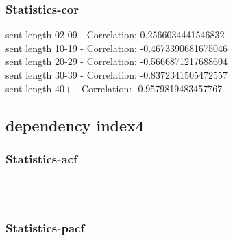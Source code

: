 \documentclass{article}%
\begin{document}
%
\newpage%
\subsubsection{Statistics{-}cor}%
\label{ssubsec:Statistics{-}cor}%
\noindent%
sent length 02-09 - Correlation: 0.2566034441546832\\%
sent length 10-19 - Correlation: -0.4673390681675046\\%
sent length 20-29 - Correlation: -0.5666871217688604\\%
sent length 30-39 - Correlation: -0.8372341505472557\\%
sent length 40+ - Correlation: -0.9579819483457767\\

%
\newpage

%
\subsection{dependency index4}%
\label{subsec:dependencyindex4}%
\subsubsection{Statistics{-}acf}%
\label{ssubsec:Statistics{-}acf}%


\begin{figure}[ht]%
\centering%
\setlength{\abovecaptionskip}{-35pt}%
%
%
\\%
%
%
\\%
%
\end{figure}

%
\newpage%
\subsubsection{Statistics{-}pacf}%
\label{ssubsec:Statistics{-}pacf}%
\end{document}
